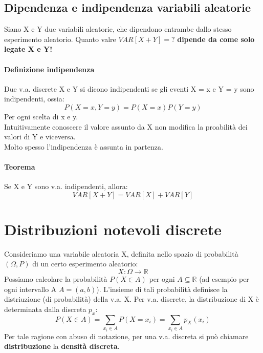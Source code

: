 \subsection{Dipendenza e indipendenza variabili aleatorie}
Siano X e Y due variabili aleatorie, che dipendono entrambe dallo 
stesso esperimento aleatorio. Quanto valre $VAR[X+Y] = ?$
\textbf{dipende da come solo legate X e Y!}
\paragraph{Definizione indipendenza} Due v.a. discrete X e Y si dicono indipendenti
se gli eventi {X = x} e {Y = y} sono indipendenti, ossia:
\begin{equation*}
    P(X=x, Y=y) = P(X = x)P(Y = y)
\end{equation*}
Per ogni scelta di x e y.
\\ Intuitivamente conoscere il valore assunto da X non modifica la proabilità dei valori
di Y e viceversa.
\\ Molto spesso l'indipendenza è assunta in partenza.

\paragraph{Teorema} Se X e Y sono v.a. indipendenti, allora:
\begin{equation*}
    VAR[X+Y] = VAR[X] + VAR[Y]
\end{equation*}

\section{Distribuzioni notevoli discrete}
Consideriamo una variabile aleatoria X, definita nello spazio di probabilità
$(\Omega, P)$ di un certo esperimento aleatorio:
\begin{equation*}
    X:\Omega \rightarrow \mathbb{R} 
\end{equation*}
Possiamo calcolare la probabilità $P(X \in A)$ per ogni $A \subseteq \mathbb{R}$
(ad esempio per ogni intervallo A $A=(a,b)$).
L'insieme di tali probabilità definisce la distriuzione (di probabilità) della v.a. X.
Per v.a. discrete, la distribuzione di X è determinata dalla discreta $p_x$:
\begin{equation*}
    P(X \in A) = \sum_{x_i \in A} P(X=x_i) = \sum_{x_i \in A} p_X(x_i)  
\end{equation*}
Per tale ragione con abuso di notazione, per una v.a. discreta si può chiamare
\textbf{distribuzione} la \textbf{densità discreta}.


